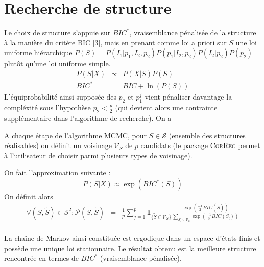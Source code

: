 \documentclass[12pt]{article}
\begin{document}
\section{Recherche de structure}
	 	
	
		Le choix de structure s'appuie sur $BIC^*$, vraisemblance pénalisée de la structure à la manière du critère BIC [3], mais en prenant comme loi a priori sur $S$ une loi uniforme hiérarchique $P(S)=P(I_1 | p_1,I_2,p_2)P(p_1|I_2,p_2)P(I_2|p_2)P(p_2)$ plutôt qu'une loi uniforme simple. 
		\begin{eqnarray}
		P(S|X)&\propto &P(X|S)P(S) \\
		BIC^*&=&BIC +\ln(P(S)) \label{Bicstar}
	\end{eqnarray}	
	L'équiprobabilité ainsi supposée des $p_2$ et $p_1^j$ vient pénaliser davantage la compléxité sous l'hypothèse $p_2<\frac{p}{2}$ (qui devient alors une contrainte supplémentaire dans l'algorithme de recherche). 
	On a

	A chaque étape de l'algorithme MCMC, pour $S \in \mathcal{S}$ (ensemble des structures réalisables) on définit un voisinage $\mathcal{V}_{S}$ de $p$ candidats (le package \textsc{CorReg} permet à l'utilisateur de choisir parmi plusieurs types de voisinage).
		
	On fait l'approximation suivante : 
	\begin{equation}
		P(S|X)\approx \exp(BIC^*(S))
	\end{equation}
	On définit alors
	\begin{eqnarray}
			\forall (S,\tilde{S}) \in \mathcal{S}^2 : \mathcal{P}(S,\tilde{S})&=& \frac{1}{p} \sum_{j=1}^p \mathbf{1}_{ \{\tilde{S}\in \mathcal{V}_{S}\} }\frac{\exp(\frac{-1}{2} BIC(\tilde{S}))}{\sum_{S_l\in \mathcal{V}_{S}}\exp(\frac{-1}{2} BIC(S_l))} \\
	\end{eqnarray}
	
		La chaîne de Markov ainsi constituée est ergodique dans un espace d'états finis et possède une unique loi stationnaire.
		Le résultat obtenu est la meilleure structure rencontrée en termes de $BIC^*$ (vraisemblance pénalisée). 
 
\end{document}
